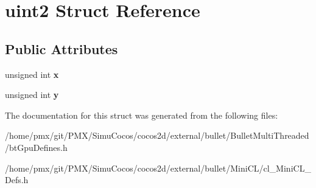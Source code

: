 \hypertarget{structuint2}{}\section{uint2 Struct Reference}
\label{structuint2}
\subsection*{Public Attributes}
\begin{DoxyCompactItemize}
\item 
\mbox{\label{structuint2_a53ddf18749ae199352286b93e76a25e8}} 
unsigned int {\bfseries x}
\item 
\mbox{\label{structuint2_a3271963db8b840c859b8c52bedb016f4}} 
unsigned int {\bfseries y}
\end{DoxyCompactItemize}


The documentation for this struct was generated from the following files\+:\begin{DoxyCompactItemize}
\item 
/home/pmx/git/\+P\+M\+X/\+Simu\+Cocos/cocos2d/external/bullet/\+Bullet\+Multi\+Threaded/bt\+Gpu\+Defines.\+h\item 
/home/pmx/git/\+P\+M\+X/\+Simu\+Cocos/cocos2d/external/bullet/\+Mini\+C\+L/cl\+\_\+\+Mini\+C\+L\+\_\+\+Defs.\+h\end{DoxyCompactItemize}
